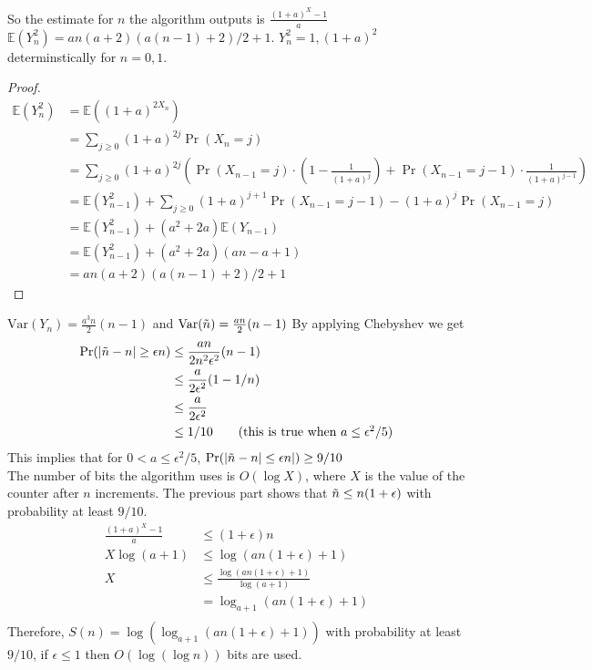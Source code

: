 \documentclass[11pt]{article}%
\begin{document}
\begin{questions}[1]
    So the estimate for $n$ the algorithm outputs is $\frac{(1 + a)^X - 1}{a}$ \\
    $\mathbb{E}(Y_n^2) = an(a + 2)(a(n-1) + 2)/2 + 1$. $Y_n^2 = 1, (1+a)^2$ determinstically for $n = 0, 1$. 
    \begin{proof}
    \begin{align*}
    \mathbb{E}(Y_n^2) &= \mathbb{E}((1+a)^{2X_n}) \\
    &= \sum_{j \geq 0} (1+a)^{2j}\Pr(X_n = j) \\
    &=  \sum_{j \geq 0}(1+a)^{2j} (\Pr(X_{n-1} = j) \cdot (1 - \frac{1}{(1+a)^j}) + \Pr(X_{n-1} = j - 1) \cdot \frac{1}{(1+a)^{j-1}}) \\
    &= \mathbb{E}(Y_{n-1}^2) + \sum_{j \geq 0}(1+a)^{j+1}\Pr(X_{n-1} = j-1) - (1+a)^j\Pr(X_{n-1} = j) \\
    &= \mathbb{E}(Y_{n-1}^2) + (a^2 + 2a)\mathbb{E}(Y_{n-1}) \\
    &= \mathbb{E}(Y_{n-1}^2) + (a^2 + 2a)(an - a + 1) \\
    &=  an(a + 2)(a(n-1) + 2)/2 + 1  \tag{By induction}
    \end{align*}
    \end{proof}
    $\mathrm{Var}(Y_n) = \frac{a^3n}{2}(n-1)$ and $\mathrm{Var}(\Tilde{n}) =  \frac{an}{2}(n-1)$
    By applying Chebyshev we get \\
    \begin{align*}
        \Pr(|\Tilde{n} - n| \geq \epsilon n) &\leq \frac{an}{2n^2\epsilon^2}(n-1) \\
        &\leq \frac{a}{2\epsilon^2}(1 - 1/n) \\
        &\leq \frac{a}{2\epsilon^2} \\
        &\leq 1/10 \tag{this is true when $a \leq \epsilon^2/5$}
    \end{align*}
    This implies that for $0 < a \leq \epsilon^2/5$, $\Pr(|\Tilde{n} - n| \leq \epsilon n|) \geq 9/10$ \\
    The number of bits the algorithm uses is $O(\log X)$, where $X$ is the value of the counter after $n$ increments. The previous part shows that $\Tilde{n} \leq n (1+ \epsilon)$ with probability at least $9/10$. \\
    \begin{align*}
        \frac{(1+a)^X - 1}{a} &\leq (1+\epsilon)n \\
        X \log(a+1) &\leq \log(an (1+\epsilon) + 1) \\ 
        X &\leq \frac{\log (an (1+\epsilon) + 1)}{\log (a+1)} \\
        &= \log_{a+1}(an (1+\epsilon) + 1) \\
    \end{align*}
    Therefore, $S(n) = \log(\log_{a+1}(an (1+\epsilon) + 1))$ with probability at least $9/10$, if $\epsilon \leq 1$ then $O(\log ( \log n))$ bits are used. 



\end{questions}
\end{document}
